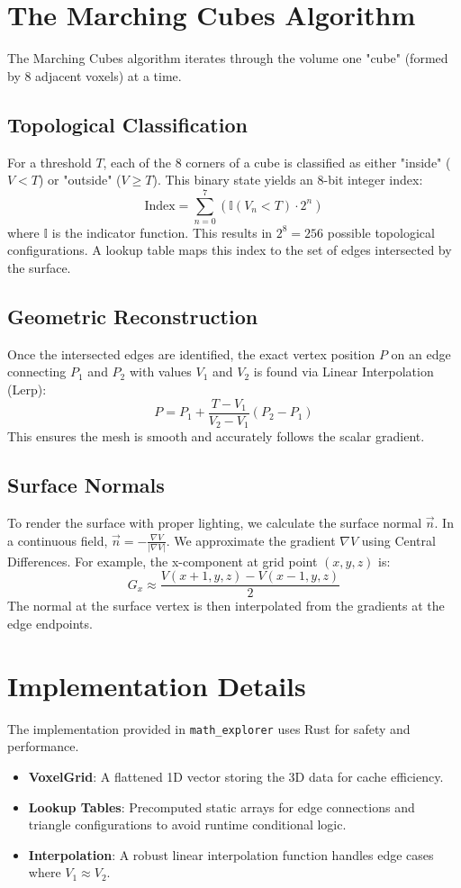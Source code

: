 \documentclass{article}
\begin{document}
\section{The Marching Cubes Algorithm}
The Marching Cubes algorithm iterates through the volume one "cube" (formed by 8 adjacent voxels) at a time.

\subsection{Topological Classification}
For a threshold $T$, each of the 8 corners of a cube is classified as either "inside" ($V < T$) or "outside" ($V \ge T$). This binary state yields an 8-bit integer index:
\[ \text{Index} = \sum_{n=0}^{7} (\mathbb{I}(V_n < T) \cdot 2^n) \]
where $\mathbb{I}$ is the indicator function.
This results in $2^8 = 256$ possible topological configurations. A lookup table maps this index to the set of edges intersected by the surface.

\subsection{Geometric Reconstruction}
Once the intersected edges are identified, the exact vertex position $P$ on an edge connecting $P_1$ and $P_2$ with values $V_1$ and $V_2$ is found via Linear Interpolation (Lerp):
\[ P = P_1 + \frac{T - V_1}{V_2 - V_1} (P_2 - P_1) \]
This ensures the mesh is smooth and accurately follows the scalar gradient.

\subsection{Surface Normals}
To render the surface with proper lighting, we calculate the surface normal $\vec{n}$. In a continuous field, $\vec{n} = -\frac{\nabla V}{|\nabla V|}$.
We approximate the gradient $\nabla V$ using Central Differences. For example, the x-component at grid point $(x,y,z)$ is:
\[ G_x \approx \frac{V(x+1,y,z) - V(x-1,y,z)}{2} \]
The normal at the surface vertex is then interpolated from the gradients at the edge endpoints.

\section{Implementation Details}
The implementation provided in \texttt{math\_explorer} uses Rust for safety and performance.
\begin{itemize}
    \item \textbf{VoxelGrid}: A flattened 1D vector storing the 3D data for cache efficiency.
    \item \textbf{Lookup Tables}: Precomputed static arrays for edge connections and triangle configurations to avoid runtime conditional logic.
    \item \textbf{Interpolation}: A robust linear interpolation function handles edge cases where $V_1 \approx V_2$.
\end{itemize}
\end{document}

